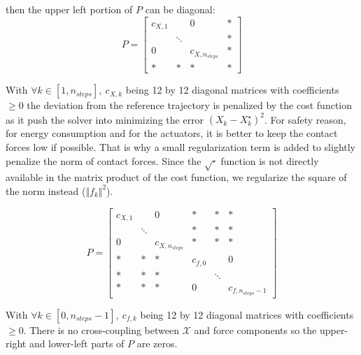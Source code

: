 \documentclass[a4paper,11pt]{article}
\begin{document}
then the upper left portion of $P$ can be diagonal:
\begin{equation}
P = \begin{bmatrix} 
c_{X,1} & & 0 & * \\
 & \ddots & & * \\
0 & & c_{X,n_{steps}} & * \\
* & * & * & *
\end{bmatrix}
\end{equation}

With $\forall k \in [1, n_{steps}],~ c_{X,k}$ being 12 by 12 diagonal matrices with coefficients $\geq 0$ the deviation from the reference trajectory is penalized by the cost function as it push the solver into minimizing the error $(X_k - X_k^\star)^2$. For safety reason, for energy consumption and for the actuators, it is better to keep the contact forces low if possible. That is why a small regularization term is added to slightly penalize the norm of contact forces. Since the $\sqrt{\cdot}$ function is not directly available in the matrix product of the cost function, we regularize the square of the norm instead ($\Vert f_k \Vert^2$).

\begin{equation}
P = \begin{bmatrix} 
c_{X,1} & & 0 & * & * & *\\
& \ddots & & * & * & * \\
0 & & c_{X,n_{steps}} & * & * & * \\
* & * & * & c_{f,0} & & 0 \\
* & * & * &  & \ddots &  \\
* & * & * & 0 & & c_{f,n_{steps}-1}
\end{bmatrix}
\end{equation}

With $\forall k \in [0, n_{steps}-1],~ c_{f,k}$ being 12 by 12 diagonal matrices with coefficients $\geq 0$. There is no cross-coupling between $\mathcal{X}$ and force components so the upper-right and lower-left parts of $P$ are zeros.
\end{document}
